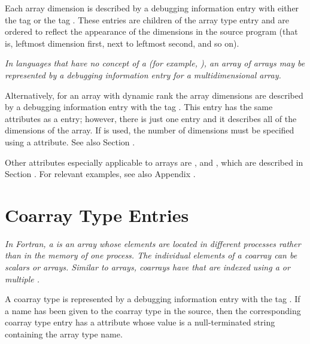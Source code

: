 Each array dimension is described by a debugging information
entry with either the
tag \DWTAGsubrangetype{} or the
tag
\DWTAGenumerationtype. These entries are
children of the
array type entry and are ordered to reflect the appearance of
the dimensions in the source program (that is, leftmost dimension
first, next to leftmost second, and so on).

\textit{In languages that have no concept of a
 (for example,
), an array of arrays may
be represented by a debugging information entry for a
multidimensional array.}

Alternatively, for an array with dynamic rank the array dimensions
are described by a debugging information entry with the tag
\DWTAGgenericsubrangeTARG.
This entry has the same attributes as a
\DWTAGsubrangetype{} entry; however,
there is just one \DWTAGgenericsubrangeNAME{} entry and it describes all of the
dimensions of the array.
If \DWTAGgenericsubrangeNAME{}
is used, the number of dimensions must be specified using a
\DWATrank{} attribute. See also Section
.

Other attributes especially applicable to arrays are
\DWATallocated,
\DWATassociated{} and
\DWATdatalocation,
which are described in
Section .
For relevant examples, see also Appendix .

\section{Coarray Type Entries}
\label{chap:coarraytypeentries}
\textit{In Fortran, a  is an array whose
elements are located in different processes rather than in the
memory of one process. The individual elements
of a coarray can be scalars or arrays.
Similar to arrays, coarrays have  that are
indexed using a  or multiple .
}

A coarray type is represented by a debugging information entry
with the tag \DWTAGcoarraytypeTARG.
If a name has been given to the
coarray type in the source, then the corresponding coarray type
entry has a \DWATname{} attribute whose value is a null-terminated
string containing the array type name.

